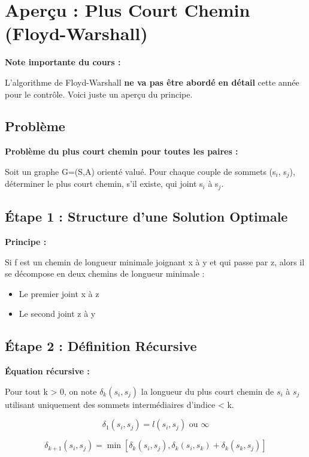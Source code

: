 \documentclass[12pt,a4paper]{article}
\begin{document}
\newpage
\section{Aperçu : Plus Court Chemin (Floyd-Warshall)}

\begin{notecours}
\textbf{Note importante du cours :}

L'algorithme de Floyd-Warshall \textbf{ne va pas être abordé en détail} cette année pour le contrôle. Voici juste un aperçu du principe.
\end{notecours}

\subsection{Problème}

\begin{definition}
\textbf{Problème du plus court chemin pour toutes les paires :}

Soit un graphe G=(S,A) orienté valué. Pour chaque couple de sommets (s$_i$, s$_j$), déterminer le plus court chemin, s'il existe, qui joint s$_i$ à s$_j$.
\end{definition}

\subsection{Étape 1 : Structure d'une Solution Optimale}

\begin{important}
\textbf{Principe :}

Si f est un chemin de longueur minimale joignant x à y et qui passe par z, alors il se décompose en deux chemins de longueur minimale :
\begin{itemize}
    \item Le premier joint x à z
    \item Le second joint z à y
\end{itemize}
\end{important}

\subsection{Étape 2 : Définition Récursive}

\begin{algorithme}
\textbf{Équation récursive :}

Pour tout k > 0, on note $\delta_k(s_i, s_j)$ la longueur du plus court chemin de $s_i$ à $s_j$ utilisant uniquement des sommets intermédiaires d'indice < k.

\[
\delta_1(s_i, s_j) = l(s_i, s_j) \text{ ou } \infty
\]

\[
\delta_{k+1}(s_i, s_j) = \min[\delta_k(s_i, s_j), \delta_k(s_i, s_k) + \delta_k(s_k, s_j)]
\]
\end{algorithme}
\end{document}
